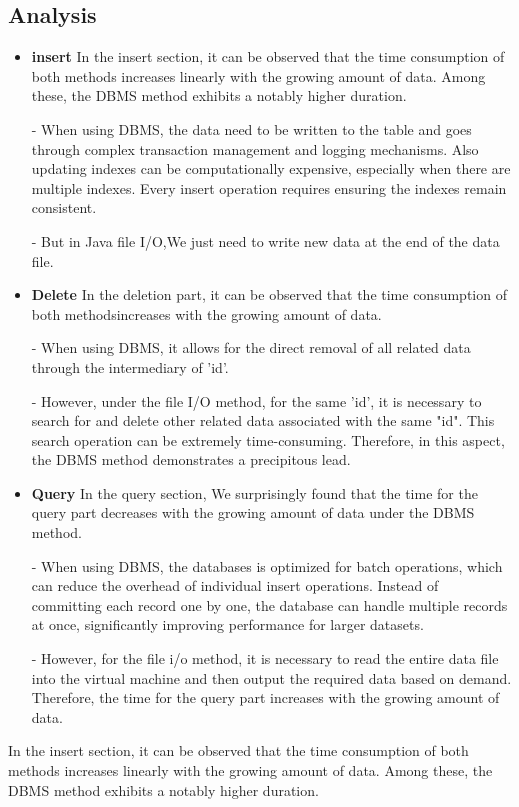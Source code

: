 \documentclass{article}
\begin{document}
\subsection{Analysis}
\begin{itemize}
\item \textbf{insert} In the insert section, it can be observed that the time consumption of both methods increases linearly with the growing amount of data. Among these, the DBMS method exhibits a notably higher duration.

- When using DBMS, the data need to be written to the table and goes through complex transaction management and logging mechanisms. Also updating indexes can be computationally expensive, especially when there are multiple indexes. Every insert operation requires ensuring the indexes remain consistent.

- But in Java file I/O,We just need to write new data at the end of the data file.
\item \textbf{Delete} In the deletion part, it can be observed that the time consumption of both
methodsincreases with the growing amount of data.

- When using DBMS, it allows for the direct removal of all related data through the intermediary of 'id'. 

- However, under the file I/O
method, for the same 'id', it is necessary to search for and delete other related
data associated with the same "id". This search operation can be extremely
time-consuming. Therefore, in this aspect, the DBMS method demonstrates a
precipitous lead.
\item \textbf{Query} In the query section, We surprisingly found that the time for the query part decreases with the growing amount of data under the DBMS method. 

- When using DBMS, the databases is optimized for batch operations, which can reduce the overhead of individual insert operations. Instead of committing each record one by one, the database can handle multiple records at once, significantly improving performance for larger datasets. 

- However, for the file i/o method, it is necessary to read the entire data file into the virtual machine and then output the required
data based on demand. Therefore, the time for the query part increases with the growing amount of data. 
\end{itemize}
In the insert section, it can be observed that the time consumption of both methods increases linearly with the growing amount of data. Among these, the DBMS method exhibits a notably higher duration. 
\end{document}
